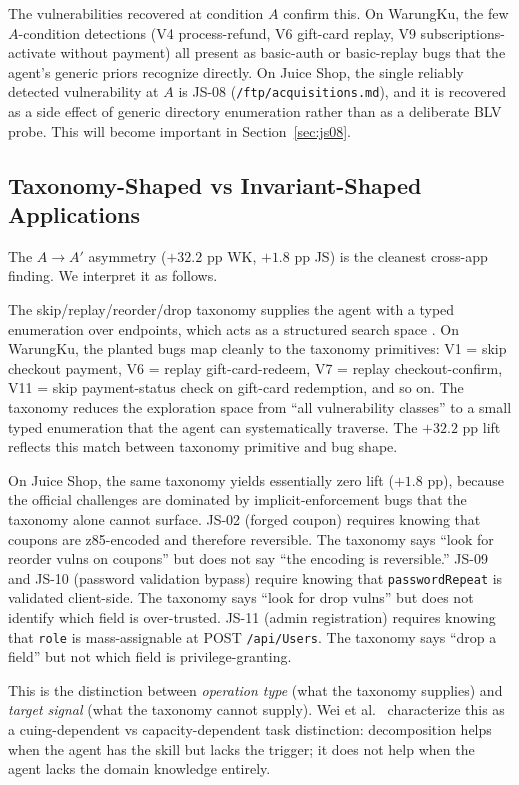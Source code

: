 \documentclass[conference]{IEEEtran}
\begin{document}
The vulnerabilities recovered at condition $A$ confirm this. On WarungKu, the few $A$-condition detections (V4 process-refund, V6 gift-card replay, V9 subscriptions-activate without payment) all present as basic-auth or basic-replay bugs that the agent's generic priors recognize directly. On Juice Shop, the single reliably detected vulnerability at $A$ is JS-08 (\texttt{/ftp/acquisitions.md}), and it is recovered as a side effect of generic directory enumeration rather than as a deliberate BLV probe. This will become important in Section~\ref{sec:js08}.

\subsection{Taxonomy-Shaped vs Invariant-Shaped Applications}

The $A \to A'$ asymmetry ($+32.2$ pp WK, $+1.8$ pp JS) is the cleanest cross-app finding. We interpret it as follows.

The skip/replay/reorder/drop taxonomy supplies the agent with a typed enumeration over endpoints, which acts as a structured search space \cite{khot2023decomposed, yao2023tot}. On WarungKu, the planted bugs map cleanly to the taxonomy primitives: V1 = skip checkout payment, V6 = replay gift-card-redeem, V7 = replay checkout-confirm, V11 = skip payment-status check on gift-card redemption, and so on. The taxonomy reduces the exploration space from ``all vulnerability classes'' to a small typed enumeration that the agent can systematically traverse. The $+32.2$ pp lift reflects this match between taxonomy primitive and bug shape.

On Juice Shop, the same taxonomy yields essentially zero lift ($+1.8$ pp), because the official challenges are dominated by implicit-enforcement bugs that the taxonomy alone cannot surface. JS-02 (forged coupon) requires knowing that coupons are z85-encoded and therefore reversible. The taxonomy says ``look for reorder vulns on coupons'' but does not say ``the encoding is reversible.'' JS-09 and JS-10 (password validation bypass) require knowing that \texttt{passwordRepeat} is validated client-side. The taxonomy says ``look for drop vulns'' but does not identify which field is over-trusted. JS-11 (admin registration) requires knowing that \texttt{role} is mass-assignable at POST \texttt{/api/Users}. The taxonomy says ``drop a field'' but not which field is privilege-granting.

This is the distinction between \emph{operation type} (what the taxonomy supplies) and \emph{target signal} (what the taxonomy cannot supply). Wei et al.\ \cite{wei2022emergent} characterize this as a cuing-dependent vs capacity-dependent task distinction: decomposition helps when the agent has the skill but lacks the trigger; it does not help when the agent lacks the domain knowledge entirely.
\end{document}
